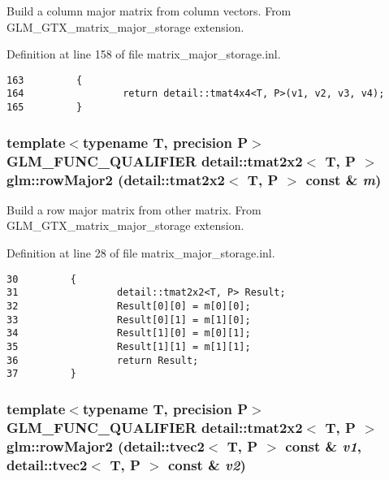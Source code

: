 Build a column major matrix from column vectors. From GLM\_\-GTX\_\-matrix\_\-major\_\-storage extension. 

Definition at line 158 of file matrix\_\-major\_\-storage.inl.

\begin{Code}\begin{verbatim}163         {
164                 return detail::tmat4x4<T, P>(v1, v2, v3, v4);
165         }
\end{verbatim}
\end{Code}


\hypertarget{group__gtx__matrix__major__storage_g9712bed19f3aa3776b59756adf3b56e2}{
\subsubsection[rowMajor2]{\setlength{\rightskip}{0pt plus 5cm}template$<$typename T, precision P$>$ GLM\_\-FUNC\_\-QUALIFIER detail::tmat2x2$<$ T, P $>$ glm::rowMajor2 (detail::tmat2x2$<$ T, P $>$ const \& {\em m})}}
\label{group__gtx__matrix__major__storage_g9712bed19f3aa3776b59756adf3b56e2}


Build a row major matrix from other matrix. From GLM\_\-GTX\_\-matrix\_\-major\_\-storage extension. 

Definition at line 28 of file matrix\_\-major\_\-storage.inl.

\begin{Code}\begin{verbatim}30         {
31                 detail::tmat2x2<T, P> Result;
32                 Result[0][0] = m[0][0];
33                 Result[0][1] = m[1][0];
34                 Result[1][0] = m[0][1];
35                 Result[1][1] = m[1][1];
36                 return Result;
37         }
\end{verbatim}
\end{Code}


\hypertarget{group__gtx__matrix__major__storage_g9d48983329e8a94489982067dfe8f5cf}{
\subsubsection[rowMajor2]{\setlength{\rightskip}{0pt plus 5cm}template$<$typename T, precision P$>$ GLM\_\-FUNC\_\-QUALIFIER detail::tmat2x2$<$ T, P $>$ glm::rowMajor2 (detail::tvec2$<$ T, P $>$ const \& {\em v1}, \/  detail::tvec2$<$ T, P $>$ const \& {\em v2})}}
\label{group__gtx__matrix__major__storage_g9d48983329e8a94489982067dfe8f5cf}


